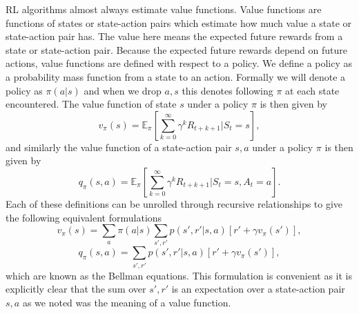 \documentclass{article}
\newcommand{\mb}{\mathbb}
\begin{document}
RL algorithms almost always estimate value functions. Value functions are functions of states or state-action pairs which estimate how much value a state or state-action pair has. The value here means the expected future rewards from a state or state-action pair. Because the expected future rewards depend on future actions, value functions are defined with respect to a policy. We define a policy as a probability mass function from a state to an action. Formally we will denote a policy as $\pi(a|s)$ and when we drop $a, s$ this denotes following $\pi$ at each state encountered. The value function of state $s$ under a policy $\pi$ is then given by
\begin{equation}
v_\pi(s) = \mb{E}_\pi[\sum_{k=0}^\infty \gamma^k R_{t+k+1}|S_t=s],
\end{equation}
and similarly the value function of a state-action pair $s, a$ under a policy $\pi$ is then given by
\begin{equation}
q_\pi(s, a) = \mb{E}_\pi[\sum_{k=0}^\infty \gamma^k R_{t+k+1}|S_t=s, A_t=a].
\end{equation}
Each of these definitions can be unrolled through recursive relationships to give the following equivalent formulations
\begin{equation}
v_\pi(s) = \sum_a \pi(a|s)\sum_{s',r'}p(s', r'|s, a)[r' + \gamma v_\pi(s')],
\end{equation}
\begin{equation}
q_\pi(s, a) = \sum_{s',r'}p(s', r'|s, a)[r' + \gamma v_\pi(s')],
\end{equation}
which are known as the Bellman equations. This formulation is convenient as it is explicitly clear that the sum over $s', r'$ is an expectation over a state-action pair $s, a$ as we noted was the meaning of a value function.
\end{document}
